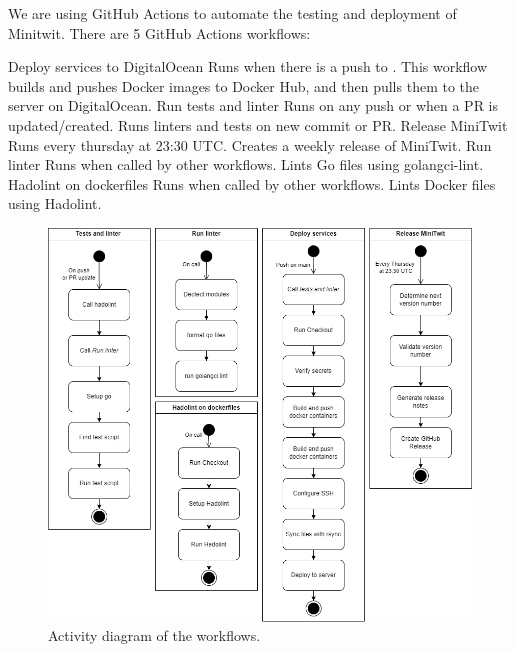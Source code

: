We are using GitHub Actions to automate the testing and deployment of Minitwit. There are 5 GitHub Actions workflows:

\begin{outline}[enumerate]
    \1 Deploy services to DigitalOcean
        \2 Runs when there is a push to .
        \2 This workflow builds and pushes Docker images to Docker Hub, and then pulls them to the server on DigitalOcean.
    \1 Run tests and linter
        \2 Runs on any push or when a PR is updated/created.
        \2 Runs linters and tests on new commit or PR.
    \1 Release MiniTwit
        \2 Runs every thursday at 23:30 UTC.
        \2 Creates a weekly release of MiniTwit.
    \1 Run linter
        \2 Runs when called by other workflows.
        \2 Lints Go files using golangci-lint.
    \1 Hadolint on dockerfiles
        \2 Runs when called by other workflows.
        \2 Lints Docker files using Hadolint.
\end{outline}
\begin{figure}[H]
    \centering
    \includegraphics[width=\textwidth]{images/Worflows.png}
    \caption{Activity diagram of the workflows.}
\end{figure}
